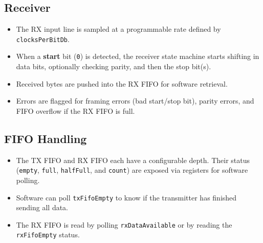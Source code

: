 \subsection{Receiver}
\begin{itemize}
  \item The RX input line is sampled at a programmable rate defined by \texttt{clocksPerBitDb}.
  \item When a \textbf{start} bit (\texttt{0}) is detected, the receiver state machine starts shifting in data bits, optionally checking parity, and then the stop bit(s).
  \item Received bytes are pushed into the RX FIFO for software retrieval.
  \item Errors are flagged for framing errors (bad start/stop bit), parity errors, and FIFO overflow if the RX FIFO is full.
\end{itemize}

\subsection{FIFO Handling}
\begin{itemize}
  \item The TX FIFO and RX FIFO each have a configurable depth. Their status (\texttt{empty}, \texttt{full}, \texttt{halfFull}, and \texttt{count}) are exposed via registers for software polling.
  \item Software can poll \texttt{txFifoEmpty} to know if the transmitter has finished sending all data.
  \item The RX FIFO is read by polling \texttt{rxDataAvailable} or by reading the \texttt{rxFifoEmpty} status.
\end{itemize}
